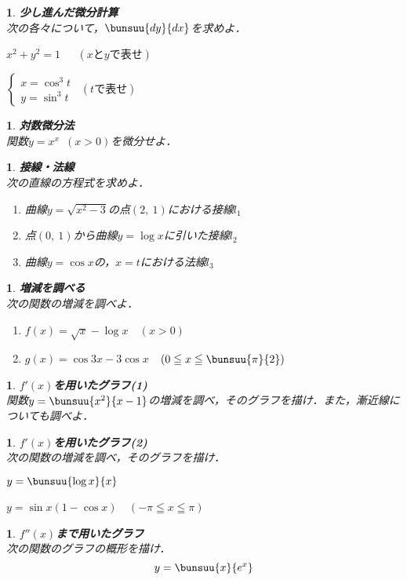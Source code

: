 \documentclass[10pt,
a4paper,
fleqn,
dvipdfmx,
uplatex
]{jsarticle}
\newtheorem{question}[Question]{}
\newcommand{\bqu}{\begin{tcolorbox}\vspace{0.5zw}\begin{question}}
\newcommand{\equ}{\end{question}\vspace{0.5zw}\end{tcolorbox}}
\newcommand{\benu}{\begin{enumerate}}
\newcommand{\eenu}{\end{enumerate}}
\newcommand{\beda}{\vspace{-1zw}\begin{edaenumerate}}
\newcommand{\eeda}{\end{edaenumerate}}
\newcommand{\bb}{\bf\boldmath}%
\newcommand{\sq}{\textstyle\sqrt}
\newcommand{\barr}{\left\{\begin{array}{l}}
\newcommand{\earr}{\end{array}\right.}
\begin{document}
{\bqu{\bb 少し進んだ微分計算}\\
次の各々について，$\bunsuu{dy}{dx}$を求めよ．
\beda
\item $x^2+y^2=1$\ \ \ $(xとyで表せ)$
\item $\barr
x=\cos^3 t\\ y=\sin^3 t 
\earr$\ $(tで表せ)$
\eeda
\equ

\bqu{\bb 対数微分法}\\
 関数$y=x^x$\ $(x>0)$を微分せよ．
\equ


\newpage

\bqu{\bb 接線・法線}\\
次の直線の方程式を求めよ．
\benu
\item 曲線$y=\sq{x^2-3}$の点$(2,\ 1)$における接線$l_1$
\item 点$(0,\ 1)$から曲線$y=\log x$に引いた接線$l_2$
\item 曲線$y=\cos x$の，$x=t$における法線$l_3$
\eenu
\equ

\bqu{\bb 増減を調べる}\\
次の関数の増減を調べよ．
\benu
\item $f(x)=\sq x-\log x$\ \ $(x>0)$
\item $g(x)=\cos 3x-3\cos x$\ \ $\left( 0\leqq x \leqq \bunsuu{\pi}{2}\right)$
\eenu
\equ

\bqu{\bb $f'(x)$を用いたグラフ(1)}\\
 関数$y=\bunsuu{x^2}{x-1}$の増減を調べ，そのグラフを描け．また，漸近線についても調べよ．
\equ

\bqu{\bb $f'(x)$を用いたグラフ(2)}\\
次の関数の増減を調べ，そのグラフを描け．
\beda
\item $y=\bunsuu{\log x}{x}$
\item $y=\sin x(1-\cos x)$\ \ $(-\pi \leqq x \leqq \pi)$
\eeda
\equ

\bqu{\bb $f''(x)$まで用いたグラフ}\\
次の関数のグラフの概形を描け．
\[y=\bunsuu{x}{e^x}\]
\equ

}
\end{document}
